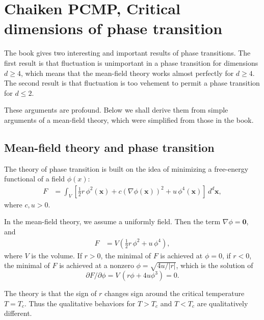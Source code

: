 \documentclass{article}
\begin{document}
\section{Chaiken PCMP, Critical dimensions of phase transition}

The book gives two interesting and important results of phase transitions.
%
The first result is that
fluctuation is unimportant in a phase transition for dimensions $d \ge 4$,
which means that the mean-field theory works almost perfectly for $d \ge 4$.
%
The second result is that
fluctuation is too vehement to permit a phase transition for $d \le 2$.

These arguments are profound.
Below we shall derive them from simple arguments of a mean-field theory,
which were simplified from those in the book.


\subsection{Mean-field theory and phase transition}



The theory of phase transition is built on the idea of minimizing
a free-energy functional of a field $\phi(x)$:
%
\begin{align}
F
&= \int_V \left[
\frac{1}{2}r \, \phi^2(\mathbf x) + c (\nabla \phi(\mathbf x))^2
+ u \, \phi^4(\mathbf x)
\right] \, d^d \mathbf x,
\label{eq:Fx}
\end{align}
where $c, u > 0$.

In the mean-field theory, we assume a uniformly field.
Then the term $\nabla \phi = \mathbf 0$, and
\begin{align}
F
&= V \left(
\frac{1}{2}r \, \phi^2 + u \, \phi^4
\right),
\end{align}
where $V$ is the volume.
If $r > 0$, the minimal of $F$ is achieved at $\phi = 0$,
if $r < 0$, the minimal of $F$ is achieved at a nonzero $\phi = \sqrt{4u/|r|}$,
which is the solution of
$$
\partial F/\partial \phi = V \, (r\phi + 4 u \phi^3) = 0.
$$



The theory is that the sign of $r$ changes sign around the critical temperature $T = T_c$.
%
Thus the qualitative behaviors for $T > T_c$ and $T < T_c$ are qualitatively different.
\end{document}
